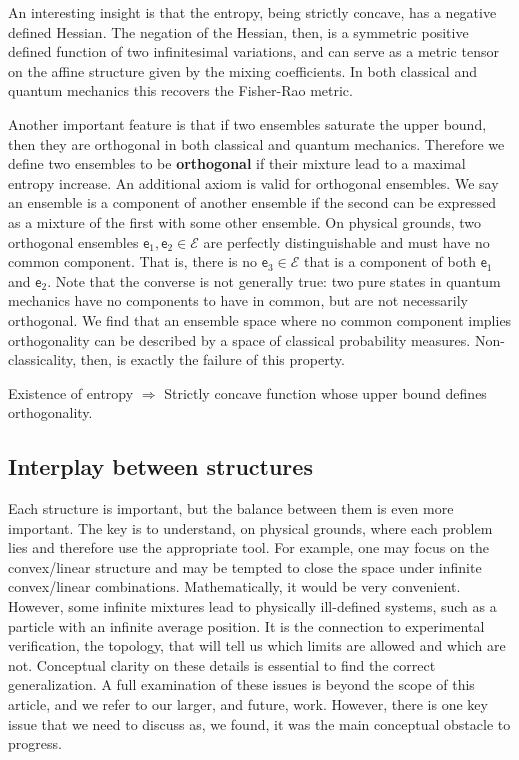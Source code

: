 \documentclass[10pt,twocolumn, nofootinbib]{revtex4-2}
\newcommand{\ens}[1][e] {\mathsf{#1}} %
\newcommand{\Ens}[1][E] {\mathcal{#1}} %
\begin{document}
An interesting insight is that the entropy, being strictly concave, has a negative defined Hessian. The negation of the Hessian, then, is a symmetric positive defined function of two infinitesimal variations, and can serve as a metric tensor on the affine structure given by the mixing coefficients. In both classical and quantum mechanics this recovers the Fisher-Rao metric.

Another important feature is that if two ensembles saturate the upper bound, then they are orthogonal in both classical and quantum mechanics. Therefore we define two ensembles to be \textbf{orthogonal} if their mixture lead to a maximal entropy increase. An additional axiom is valid for orthogonal ensembles. We say an ensemble is a component of another ensemble if the second can be expressed as a mixture of the first with some other ensemble. On physical grounds, two orthogonal ensembles $\ens_1, \ens_2 \in \Ens$ are perfectly distinguishable and must have no common component. That is, there is no $\ens_3 \in \Ens$ that is a component of both $\ens_1$ and $\ens_2$. Note that the converse is not generally true: two pure states in quantum mechanics have no components to have in common, but are not necessarily orthogonal. We find that an ensemble space where no common component implies orthogonality can be described by a space of classical probability measures. Non-classicality, then, is exactly the failure of this property.

\begin{tcolorbox}[colback=white, colframe=black]
	Existence of entropy $\Rightarrow$ Strictly concave function whose upper bound defines orthogonality.
\end{tcolorbox}

\subsection{Interplay between structures}

Each structure is important, but the balance between them is even more important. The key is to understand, on physical grounds, where each problem lies and therefore use the appropriate tool. For example, one may focus on the convex/linear structure and may be tempted to close the space under infinite convex/linear combinations. Mathematically, it would be very convenient. However, some infinite mixtures lead to physically ill-defined systems, such as a particle with an infinite average position. It is the connection to experimental verification, the topology, that will tell us which limits are allowed and which are not. Conceptual clarity on these details is essential to find the correct generalization. A full examination of these issues is beyond the scope of this article, and we refer to our larger, and future, work. However, there is one key issue that we need to discuss as, we found, it was the main conceptual obstacle to progress.
\end{document}
